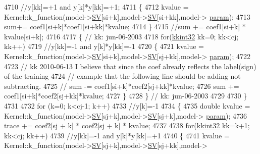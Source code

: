 \begin{DoxyCode}
4710             \textcolor{comment}{//y[kk]=+1 and y[k]*y[kk]=+1;}
4711           \{
4712             kvalue = Kernel::k\_function(model->\hyperlink{struct_s_v_m233_1_1_svm_model233_a97dd1118f0bf7803ad6f4d952a56d06b}{SV}[si+k],model->\hyperlink{struct_s_v_m233_1_1_svm_model233_a97dd1118f0bf7803ad6f4d952a56d06b}{SV}[si+kk],model->
      \hyperlink{struct_s_v_m233_1_1_svm_model233_aea9d5d416f02777981c7677da2044571}{param});
4713             sum+= coef1[si+k]*coef1[si+kk]*kvalue;
4714           \}
4715           \textcolor{comment}{//sum += coef1[si+k] * kvalue[si+k];}
4716 
4717           \{  \textcolor{comment}{// kk:  jun-06-2003}
4718             \textcolor{keywordflow}{for}(\hyperlink{namespace_k_k_b_a8fa4952cc84fda1de4bec1fbdd8d5b1b}{kkint32} kk=0; kk<cj; kk++)
4719               \textcolor{comment}{//y[kk]=-1 and y[k]*y[kk]=-1}
4720             \{
4721               kvalue = Kernel::k\_function(model->\hyperlink{struct_s_v_m233_1_1_svm_model233_a97dd1118f0bf7803ad6f4d952a56d06b}{SV}[si+k],model->\hyperlink{struct_s_v_m233_1_1_svm_model233_a97dd1118f0bf7803ad6f4d952a56d06b}{SV}[sj+kk],model->
      \hyperlink{struct_s_v_m233_1_1_svm_model233_aea9d5d416f02777981c7677da2044571}{param});
4722 
4723               \textcolor{comment}{// kk  2010-06-13   I believe that since the coef already reflects the label(sign) of the
       training }
4724               \textcolor{comment}{//                  example that the following line should be adding not subtracting.}
4725               \textcolor{comment}{// sum -= coef1[si+k]*coef2[sj+kk]*kvalue;}
4726               sum += coef1[si+k]*coef2[sj+kk]*kvalue;
4727             \}
4728           \}  \textcolor{comment}{// kk:  jun-06-2003}
4729 
4730         \}
4731 
4732         \textcolor{keywordflow}{for} (k=0; k<cj-1; k++)
4733           \textcolor{comment}{//y[k]=-1}
4734         \{
4735           \textcolor{keywordtype}{double} kvalue = Kernel::k\_function(model->\hyperlink{struct_s_v_m233_1_1_svm_model233_a97dd1118f0bf7803ad6f4d952a56d06b}{SV}[sj+k],model->\hyperlink{struct_s_v_m233_1_1_svm_model233_a97dd1118f0bf7803ad6f4d952a56d06b}{SV}[sj+k],model->
      \hyperlink{struct_s_v_m233_1_1_svm_model233_aea9d5d416f02777981c7677da2044571}{param});
4736           trace += coef2[sj + k] * coef2[sj + k] * kvalue;
4737 
4738           \textcolor{keywordflow}{for}(\hyperlink{namespace_k_k_b_a8fa4952cc84fda1de4bec1fbdd8d5b1b}{kkint32} kk=k+1; kk<cj; kk++)
4739             \textcolor{comment}{//y[kk]=-1 and y[k]*y[kk]=+1}
4740           \{
4741             kvalue = Kernel::k\_function(model->\hyperlink{struct_s_v_m233_1_1_svm_model233_a97dd1118f0bf7803ad6f4d952a56d06b}{SV}[sj+k],model->\hyperlink{struct_s_v_m233_1_1_svm_model233_a97dd1118f0bf7803ad6f4d952a56d06b}{SV}[sj+kk],model->

\end{DoxyCode}
